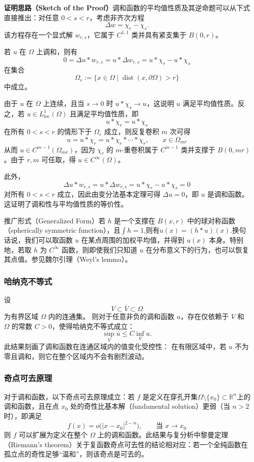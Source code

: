 \textbf{证明思路（Sketch of the Proof）}调和函数的平均值性质及其逆命题可以从下式直接推出：对任意 \(0 < s < r\)，考虑非齐次方程
\[
\Delta w = \chi_r - \chi_s.~
\]
该方程存在一个显式解 \(w_{r,s}\)，它属于 \(C^{1,1}\) 类并具有紧支集于 \(B(0,r)\)。

若 \(u\) 在 \(\Omega\) 上调和，则有
\[
0 = \Delta u * w_{r,s} = u * \Delta w_{r,s} = u * \chi_r - u * \chi_s~
\]
在集合
\[
\Omega_r := \{x \in \Omega \mid \operatorname{dist}(x, \partial \Omega) > r \}~
\]
中成立。

由于 \(u\) 在 \(\Omega\) 上连续，且当 \(s \to 0\) 时 \(u * \chi_s \to u\)，这说明 \(u\) 满足平均值性质。反之，若 \(u \in L^1_{\mathrm{loc}}(\Omega)\) 且满足平均值性质，即
\[
u * \chi_r = u * \chi_s~
\]
在所有 \(0 < s < r\) 的情形下于 \(\Omega_r\) 成立，则反复卷积 \(m\) 次可得
\[
u = u * \chi_r = u * \chi_r * \cdots * \chi_r, \qquad x \in \Omega_{mr}~
\]
从而 \(u \in C^{m-1}(\Omega_{mr})\)，因为 \(\chi_r\) 的 \(m\)-重卷积属于 \(C^{m-1}\) 类并支撑于 \(B(0,mr)\)。由于 \(r,m\) 可任取，得 \(u \in C^{\infty}(\Omega)\)。

此外，
\[
\Delta u * w_{r,s} = u * \Delta w_{r,s} = u * \chi_r - u * \chi_s = 0~
\]
对所有 \(0 < s < r\) 成立，因此由变分法基本定理可得 \(\Delta u = 0\)，即 \(u\) 是调和函数。这证明了调和性与平均值性质的等价性。

推广形式（Generalized Form）若 \(h\) 是一个支撑在 \(B(x, r)\) 中的球对称函数（spherically symmetric function），且\(\int h = 1\),则有\(u(x) = (h * u)(x)\).换句话说，我们可以取函数 \(u\) 在某点周围的加权平均值，并得到 \(u(x)\) 本身。特别地，若取 \(h\) 为 \(C^{\infty}\) 函数，则即使我们只知道 \(u\) 在分布意义下的行为，也可以恢复其点值。参见魏尔引理（Weyl’s lemma）。
\subsubsection{哈纳克不等式}
设
\[
V \subset \overline{V} \subset \Omega~
\]
为有界区域 \(\Omega\) 内的连通集。  
则对于任意非负的调和函数 \(u\)，存在仅依赖于 \(V\) 和 \(\Omega\) 的常数 \(C > 0\)，使得哈纳克不等式成立：
\[
\sup_{V} u \leq C \inf_{V} u.~
\]
此结果刻画了调和函数在连通区域内的值变化受控性：  
在有限区域中，若 \(u\) 不为零且调和，则它在整个区域内不会有剧烈波动。
\subsubsection{奇点可去原理}
对于调和函数，以下奇点可去原理成立：若 \( f \) 是定义在穿孔开集\(\Omega \setminus \{x_0\} \subset \mathbb{R}^n\)上的调和函数，且在点 \(x_0\) 处的奇性比基本解（fundamental solution）更弱（当 \(n > 2\) 时），即满足
\[
f(x) = o\bigl(|x - x_0|^{2 - n}\bigr), \qquad \text{当 } x \to x_0~
\]
则 \(f\) 可以扩展为定义在整个 \(\Omega\) 上的调和函数。此结果与复分析中黎曼定理（Riemann's theorem）关于复函数奇点可去性的结论相对应：若一个全纯函数在孤立点的奇性足够“温和”，则该奇点是可去的。
